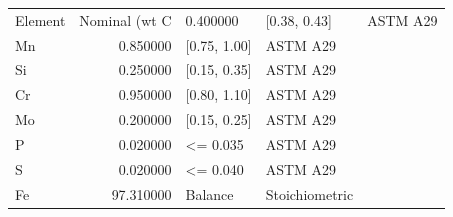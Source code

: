 \begin{tabular}{lrll}
\toprule
Element & Nominal (wt%
\midrule
C & 0.400000 & [0.38, 0.43] & ASTM A29 \\
Mn & 0.850000 & [0.75, 1.00] & ASTM A29 \\
Si & 0.250000 & [0.15, 0.35] & ASTM A29 \\
Cr & 0.950000 & [0.80, 1.10] & ASTM A29 \\
Mo & 0.200000 & [0.15, 0.25] & ASTM A29 \\
P & 0.020000 & <= 0.035 & ASTM A29 \\
S & 0.020000 & <= 0.040 & ASTM A29 \\
Fe & 97.310000 & Balance & Stoichiometric \\
\bottomrule
\end{tabular}
